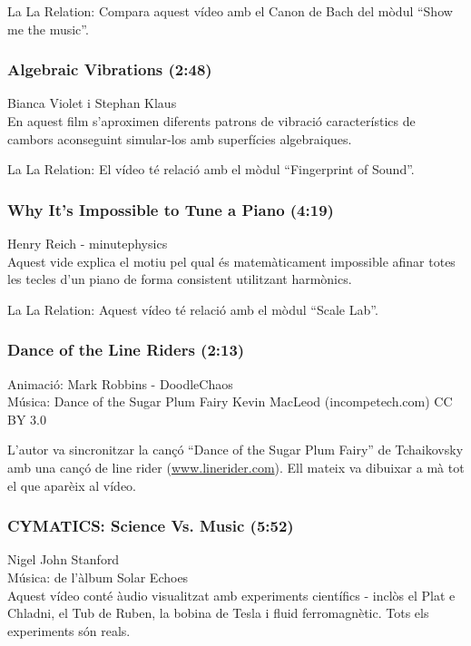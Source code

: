 La La Relation: Compara aquest vídeo amb el Canon de Bach del mòdul ``Show me the music''.

\subsubsection*{Algebraic Vibrations (2:48)}
Bianca Violet i Stephan Klaus\\

En aquest film s'aproximen diferents patrons de vibració característics de cambors aconseguint simular-los amb superfícies algebraiques.  

La La Relation: El vídeo té relació amb el mòdul ``Fingerprint of Sound''.

\subsubsection*{Why It's Impossible to Tune a Piano (4:19)}
Henry Reich - minutephysics\\

Aquest vide explica el motiu pel qual és matemàticament impossible afinar totes les tecles d'un piano de forma consistent utilitzant harmònics. 

La La Relation: Aquest vídeo té relació amb el mòdul ``Scale Lab''.

\subsubsection*{Dance of the Line Riders (2:13)}
Animació: Mark Robbins - DoodleChaos \\
Música: Dance of the Sugar Plum Fairy Kevin MacLeod (incompetech.com) CC BY 3.0

L'autor va sincronitzar la cançó ``Dance of the Sugar Plum Fairy'' de Tchaikovsky amb una cançó de line rider (\url{www.linerider.com}). Ell mateix va dibuixar a mà tot el que aparèix al vídeo. 

\subsubsection*{CYMATICS: Science Vs. Music (5:52)}
Nigel John Stanford \\
Música: de l'àlbum Solar Echoes\\

Aquest vídeo conté àudio visualitzat amb experiments científics - inclòs el Plat e Chladni, el Tub de Ruben, la bobina de Tesla i fluid ferromagnètic. Tots els experiments són reals.

